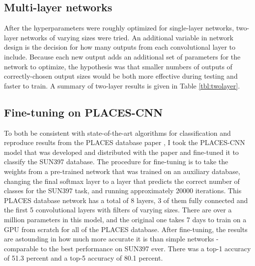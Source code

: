 \documentclass[10pt]{article}
\begin{document}
\subsection{Multi-layer networks}

After the hyperparameters were roughly optimized for single-layer networks, two-layer networks of varying sizes were tried. An additional variable in network design is the decision for how many outputs from each convolutional layer to include. Because each new output adds an additional set of parameters for the network to optimize, the hypothesis was that smaller numbers of outputs of correctly-chosen output sizes would be both more effective during testing and faster to train. A summary of two-layer results is given in Table \ref{tbl:twolayer}.

\begin{table}[!ht]
\centering
{}
\caption{Summary of top-1 and top-5 accuracy results on two-layer networks after 20000 iterations}
\label{tbl:twolayer}
\end{table}

\subsection{Fine-tuning on PLACES-CNN}

To both be consistent with state-of-the-art algorithms for classification and reproduce results from the PLACES database paper \cite{zhou_learning_2014}, I took the PLACES-CNN model that was developed and distributed with the paper and fine-tuned it to classify the SUN397 database. The procedure for fine-tuning is to take the weights from a pre-trained network that was trained on an auxiliary database, changing the final softmax layer to a layer that predicts the correct number of classes for the SUN397 task, and running approximately 20000 iterations. This PLACES database network has a total of 8 layers, 3 of them fully connected and the first 5 convolutional layers with filters of varying sizes. There are over a million parameters in this model, and the original one takes 7 days to train on a GPU from scratch for all of the PLACES database. After fine-tuning, the results are astounding in how much more accurate it is than simple networks - comparable to the best performance on SUN397 ever. There was a top-1 accuracy of 51.3 percent and a top-5 accuracy of 80.1 percent.
\end{document}

